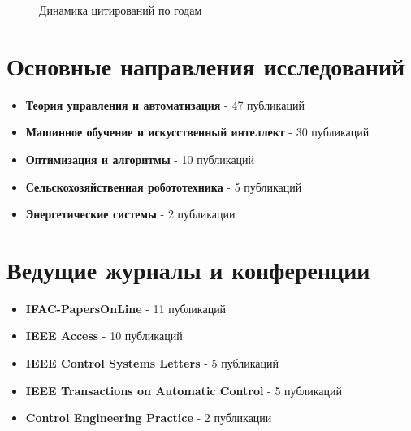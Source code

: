 \documentclass{article}
\begin{document}
\begin{figure}[h]
\centering
{}
\caption{Динамика цитирований по годам}
\end{figure}



\section*{Основные направления исследований}

\begin{itemize}
\item \textbf{Теория управления и автоматизация} - 47 публикаций
\item \textbf{Машинное обучение и искусственный интеллект} - 30 публикаций
\item \textbf{Оптимизация и алгоритмы} - 10 публикаций
\item \textbf{Сельскохозяйственная робототехника} - 5 публикаций
\item \textbf{Энергетические системы} - 2 публикации
\end{itemize}

\section*{Ведущие журналы и конференции}

\begin{itemize}
\item \textbf{IFAC-PapersOnLine} - 11 публикаций
\item \textbf{IEEE Access} - 10 публикаций
\item \textbf{IEEE Control Systems Letters} - 5 публикаций
\item \textbf{IEEE Transactions on Automatic Control} - 5 публикаций
\item \textbf{Control Engineering Practice} - 2 публикации
\end{itemize}
\end{document}
